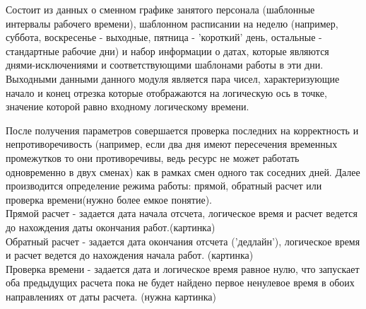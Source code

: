 Состоит из данных о сменном графике занятого персонала (шаблонные интервалы рабочего времени), шаблонном расписании на неделю (например, суббота, воскресенье - выходные, пятница - 'короткий' день, остальные - стандартные рабочие дни) и набор информации о датах, которые являются днями-исключениями и соответствующими шаблонами работы в эти дни.\\
\indent Выходными данными данного модуля является пара чисел, характеризующие начало и конец отрезка которые отображаются на логическую ось в точке, значение которой равно входному логическому времени.\\

\indent После получения параметров совершается проверка последних на корректность и непротиворечивость (например, если два дня имеют пересечения временных промежутков то они противоречивы, ведь ресурс не может работать одновременно в двух сменах) как в рамках смен одного так соседних дней.
Далее производится определение режима работы: прямой, обратный расчет или проверка времени(нужно более емкое понятие).\\
\indent Прямой расчет - задается дата начала отсчета, логическое время и расчет ведется до нахождения даты окончания работ.(картинка)\\
\indent Обратный расчет - задается дата окончания отсчета ('дедлайн'), логическое время и расчет ведется до нахождения начала работ. (картинка)\\
\indent Проверка времени - задается дата и логическое время равное нулю, что запускает оба предыдущих расчета пока не будет найдено первое ненулевое время в обоих направлениях от даты расчета. (нужна картинка)\\

